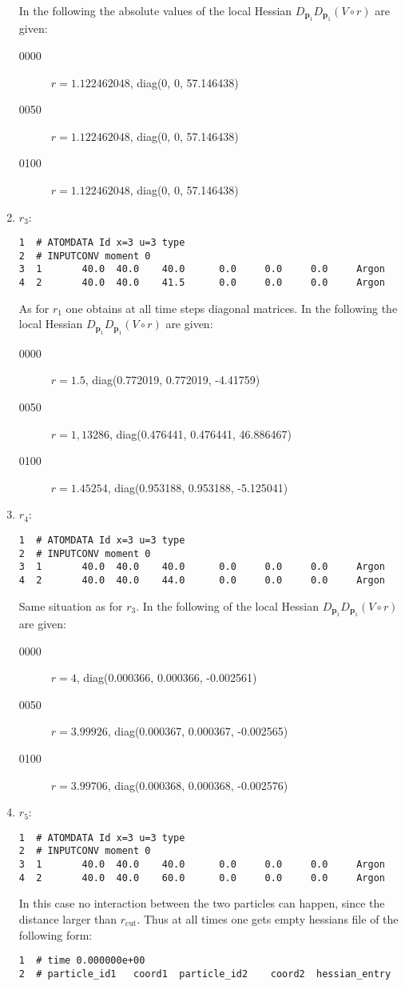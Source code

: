 \documentclass[a4paper]{article}
\newcommand{\boldp}{\boldsymbol{p}}
\begin{document}
\begin{enumerate}
In the following the absolute values of the local Hessian \(D_{\boldp_1} D_{\boldp_1} (V\circ r)\) are given:
\begin{description}
\item[{0000}] \(r = 1.122462048\), diag(0, 0, 57.146438)
\item[{0050}] \(r = 1.122462048\), diag(0, 0, 57.146438)
\item[{0100}] \(r = 1.122462048\), diag(0, 0, 57.146438)
\end{description}
\item \(r_3\):
\label{sec-1-4-3-4}
\begin{verbatim}
1  # ATOMDATA Id x=3 u=3 type
2  # INPUTCONV moment 0
3  1       40.0  40.0    40.0      0.0     0.0     0.0     Argon
4  2       40.0  40.0    41.5      0.0     0.0     0.0     Argon
\end{verbatim}
As for \(r_1\) one obtains at all time steps diagonal matrices.
In the following the local Hessian \(D_{\boldp_1} D_{\boldp_1} (V\circ r)\) are given:
\begin{description}
\item[{0000}] \(r = 1.5\), diag(0.772019, 0.772019, -4.41759)
\item[{0050}] \(r = 1,13286\), diag(0.476441, 0.476441, 46.886467)
\item[{0100}] \(r = 1.45254\), diag(0.953188, 0.953188, -5.125041)
\end{description}
\item \(r_4\):
\label{sec-1-4-3-5}
\begin{verbatim}
1  # ATOMDATA Id x=3 u=3 type
2  # INPUTCONV moment 0
3  1       40.0  40.0    40.0      0.0     0.0     0.0     Argon
4  2       40.0  40.0    44.0      0.0     0.0     0.0     Argon
\end{verbatim}
Same situation as for \(r_3\).
In the following of the local Hessian \(D_{\boldp_1} D_{\boldp_1} (V\circ r)\) are given:
\begin{description}
\item[{0000}] \(r = 4\), diag(0.000366, 0.000366, -0.002561)
\item[{0050}] \(r = 3.99926\), diag(0.000367, 0.000367, -0.002565)
\item[{0100}] \(r = 3.99706\), diag(0.000368, 0.000368, -0.002576)
\end{description}
\item \(r_5\):
\label{sec-1-4-3-6}
\begin{verbatim}
1  # ATOMDATA Id x=3 u=3 type
2  # INPUTCONV moment 0
3  1       40.0  40.0    40.0      0.0     0.0     0.0     Argon
4  2       40.0  40.0    60.0      0.0     0.0     0.0     Argon
\end{verbatim}
In this case no interaction between the two particles can happen, since the distance larger than \(r_{\textrm{cut}}\). Thus at all times one gets empty hessians file of the following form:
\begin{verbatim}
1  # time 0.000000e+00
2  # particle_id1   coord1  particle_id2    coord2  hessian_entry
\end{verbatim}
\end{enumerate}
\end{document}
